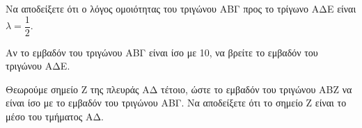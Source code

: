 \begin{alist}
    \item Να αποδείξετε ότι ο λόγος ομοιότητας του τριγώνου ΑΒΓ προς το τρίγωνο ΑΔΕ είναι $\lambda = \dfrac{1}{2}$. 
    \item Αν το εμβαδόν του τριγώνου ΑΒΓ είναι ίσο με 10, να βρείτε το εμβαδόν του τριγώνου ΑΔΕ. 
    \item Θεωρούμε σημείο Ζ της πλευράς ΑΔ τέτοιο, ώστε το εμβαδόν του τριγώνου ΑΒΖ να είναι ίσο με το εμβαδόν του τριγώνου ΑΒΓ. Να αποδείξετε ότι το σημείο Ζ είναι το μέσο του τμήματος ΑΔ. 
\end{alist}